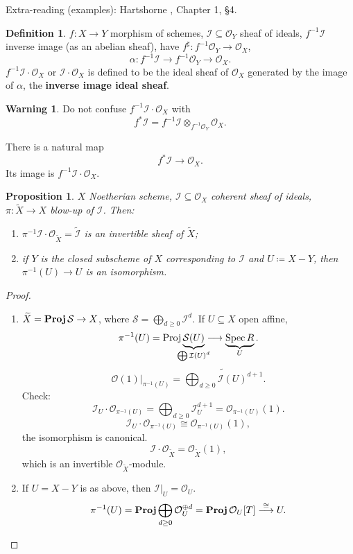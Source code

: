 \documentclass[12pt]{article}
\DeclareMathOperator{\Spec}{Spec}
\DeclareMathOperator{\Proj}{Proj}
\DeclareMathOperator{\relProj}{\textnormal{\textbf{Proj}}}
\newtheorem*{proposition}{Proposition}
\theoremstyle{definition}
\newtheorem*{definition}{Definition}
\newtheorem*{warning}{Warning}
\begin{document}
Extra-reading (examples): Hartshorne \cite{hartshorne2013algebraic}, Chapter 1, \S 4.

\begin{definition}
$f:X\rightarrow Y$ morphism of schemes, $\mathcal I\subseteq\mathcal O_Y$ sheaf of ideals, $f^{-1}\mathcal I$ inverse image (as an abelian sheaf), have $f^\sharp:f^{-1}\mathcal O_Y\rightarrow\mathcal O_X$,
\[\alpha:f^{-1}\mathcal I\longrightarrow f^{-1}\mathcal O_Y\longrightarrow\mathcal O_X.\]
$f^{-1}\mathcal I\cdot\mathcal O_X$ or $\mathcal I\cdot\mathcal O_X$ is defined to be the ideal sheaf of $\mathcal O_X$ generated by the image of $\alpha$, the \textbf{inverse image ideal sheaf}.
\end{definition}

\begin{warning}
Do not confuse $f^{-1}\mathcal I\cdot\mathcal O_X$ with
\[f^*\mathcal I=f^{-1}\mathcal I\otimes_{f^{-1}\mathcal O_Y}\mathcal O_X.\]

There is a natural map
\[f^*\mathcal I\longrightarrow\mathcal O_X.\]
Its image is $f^{-1}\mathcal I\cdot\mathcal O_X$.
\end{warning}

\begin{proposition}
$X$ Noetherian scheme, $\mathcal I\subseteq\mathcal O_X$ coherent sheaf of ideals, $\pi:\widetilde X\rightarrow X$ blow-up of $\mathcal I$. Then:
\begin{enumerate}[label=\arabic*)]
\item $\pi^{-1}\mathcal I\cdot\mathcal O_{\widetilde X}=\widetilde{\mathcal I}$ is an invertible sheaf of $\widetilde X$;
\item if $Y$ is the closed subscheme of $X$ corresponding to $\mathcal I$ and $U\coloneqq X-Y$, then $\pi^{-1}(U)\rightarrow U$ is an isomorphism.
\end{enumerate}
\end{proposition}

\begin{proof}
\begin{enumerate}[label=\arabic*)]
\item $\widetilde X=\relProj\mathcal S\rightarrow X$, where $\mathcal S=\bigoplus_{d\geq0}\mathcal I^d$. If $U\subseteq X$ open affine,
\[\pi^{-1}(U)=\Proj\underbrace{\mathcal S(U)}_{\mathclap{\bigoplus\mathcal I(U)^d}}\longrightarrow\underbrace{\Spec R}_U.\]
\[\mathcal O(1)|_{\pi^{-1}(U)}=\widetilde{\bigoplus_{d\geq0}\mathcal I(U)^{d+1}}.\]
Check:
\[\mathcal I_U\cdot\mathcal O_{\pi^{-1}(U)}=\bigoplus_{d\geq0}\mathcal I_U^{d+1}=\mathcal O_{\pi^{-1}(U)}(1).\]
\[\mathcal I_U\cdot\mathcal O_{\pi^{-1}(U)}\cong\mathcal O_{\pi^{-1}(U)}(1),\]
the isomorphism is canonical.
\[\mathcal I\cdot\mathcal O_{\widetilde X}=\mathcal O_{\widetilde X}(1),\]
which is an invertible $\mathcal O_{\widetilde X}$-module.

\item If $U=X-Y$ is as above, then $\mathcal I|_U=\mathcal O_U$.
\[\pi^{-1}(U)=\relProj\bigoplus_{d\geq0}\mathcal O_U^{\oplus d}=\relProj\mathcal O_U[T]\overset\cong\longrightarrow U.\]
\end{enumerate}
\end{proof}
\end{document}
